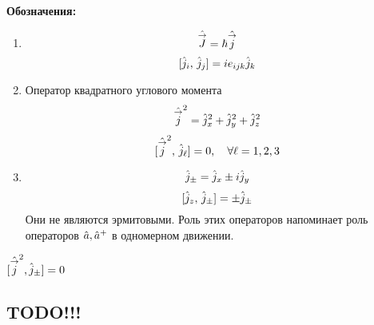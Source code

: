 
\textbf{Обозначения:}
\begin{enumerate}
  \item
  $$
    \hat{\overset{\to}{J}} = \hbar \hat{\overset{\to}{j}}
  $$
  $$
    [\hat j_i, \, \hat j_j] = i e_{ijk} \Hat j_k
  $$
  \item Оператор квадратного углового момента
  $$
    {\hat{\overset{\to}{j}}}^2 = \hat j_x^2 + \hat j_y^2 + \hat j_z^2
  $$
  $$
    [\hat{\overset{\to}{j}}^2, \, \Hat j_\ell] = 0, \quad \forall \ell = 1, 2, 3
  $$
  \item
  $$
    \Hat j_\pm = \Hat j_x \pm i \Hat j_y
  $$
  $$
    [\Hat j_z, \, \Hat j_\pm] = \pm \Hat j_\pm
  $$
  Они не являются эрмитовыми. Роль этих операторов напоминает роль операторов $\Hat a, \Hat a^+$ в одномерном движении.
\end{enumerate}
\Cor $[\hat{\overset{\to}{j}}^2, \hat j_\pm] = 0$
\subsection{TODO!!!}


